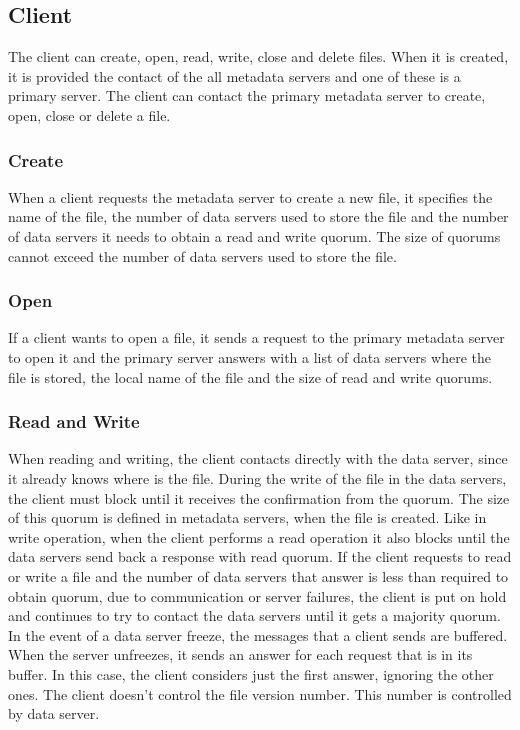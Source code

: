\subsection{Client}

The client can create, open, read, write, close and delete files. When
it is created, it is provided the contact of the all metadata servers
and one of these is a primary server. 
The client can contact the primary metadata server to create, open,
close or delete a file.

\subsubsection{Create} 

When a client requests the metadata server to create a new file, it
specifies the name of the file, the number of data servers used to
store the file and the number of data servers it needs to obtain a read
and write quorum. The size of quorums cannot exceed the number of data
servers used to store the file.

\subsubsection{Open}

If a client wants to open a file, it sends a request to the primary
metadata server to open it and the primary server answers with a list
of data servers where the file is stored, the local name of the file and 
the size of read and write quorums.

\subsubsection{Read and Write}

When reading and writing, the client contacts directly with the data server,
since it already knows where is the file. During the write of
the file in the data servers, the client must block until it receives the
confirmation from the quorum. The size of this quorum is defined in
metadata servers, when the file is created. Like in write operation, when the
client performs a read operation it also blocks until the data servers send 
back a response with read quorum.
If the client requests to read or write a file and the number of data
servers that answer is less than required to obtain quorum, due to
communication or server failures, the client is put on
hold and continues to try to contact the data servers until it gets a
majority quorum.
In the event of a data server freeze, the messages that a client sends are
buffered. When the server unfreezes, it sends an answer for each request
that is in its buffer. In this case, the client considers just the first
answer, ignoring the other ones.
The client doesn't control the file version number. This number is
controlled by data server.

